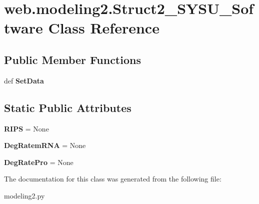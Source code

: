 \hypertarget{classweb_1_1modeling2_1_1_struct2___s_y_s_u___software}{\section{web.\-modeling2.\-Struct2\-\_\-\-S\-Y\-S\-U\-\_\-\-Software Class Reference}
\label{classweb_1_1modeling2_1_1_struct2___s_y_s_u___software}
}
\subsection*{Public Member Functions}
\begin{DoxyCompactItemize}
\item 
\hypertarget{classweb_1_1modeling2_1_1_struct2___s_y_s_u___software_a97278d942fdef1aa4aede9b92603af35}{def {\bfseries Set\-Data}}\label{classweb_1_1modeling2_1_1_struct2___s_y_s_u___software_a97278d942fdef1aa4aede9b92603af35}

\end{DoxyCompactItemize}
\subsection*{Static Public Attributes}
\begin{DoxyCompactItemize}
\item 
\hypertarget{classweb_1_1modeling2_1_1_struct2___s_y_s_u___software_a50a0d48cf0b33860910cdbf062e2dedc}{{\bfseries R\-I\-P\-S} = None}\label{classweb_1_1modeling2_1_1_struct2___s_y_s_u___software_a50a0d48cf0b33860910cdbf062e2dedc}

\item 
\hypertarget{classweb_1_1modeling2_1_1_struct2___s_y_s_u___software_a76bff92cc7a6d434f2d4bd0a438da3fa}{{\bfseries Deg\-Ratem\-R\-N\-A} = None}\label{classweb_1_1modeling2_1_1_struct2___s_y_s_u___software_a76bff92cc7a6d434f2d4bd0a438da3fa}

\item 
\hypertarget{classweb_1_1modeling2_1_1_struct2___s_y_s_u___software_af72e06487c032d2863dc53fe71ed21f9}{{\bfseries Deg\-Rate\-Pro} = None}\label{classweb_1_1modeling2_1_1_struct2___s_y_s_u___software_af72e06487c032d2863dc53fe71ed21f9}

\end{DoxyCompactItemize}


The documentation for this class was generated from the following file\-:\begin{DoxyCompactItemize}
\item 
modeling2.\-py\end{DoxyCompactItemize}
